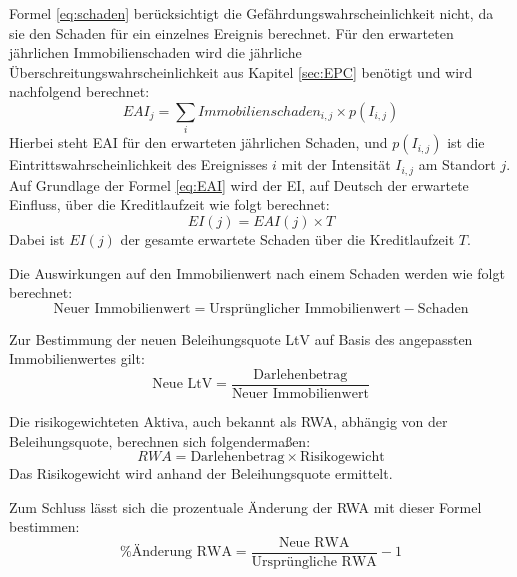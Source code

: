 Formel \ref{eq:schaden} berücksichtigt die Gefährdungswahrscheinlichkeit nicht, da sie den Schaden für ein einzelnes Ereignis berechnet. Für den erwarteten jährlichen Immobilienschaden wird die jährliche Überschreitungswahrscheinlichkeit aus Kapitel \ref{sec:EPC} benötigt und wird nachfolgend berechnet:
\begin{equation}
    EAI_j = \sum_i Immobilienschaden_{i,j} \times p(I_{i,j})
    \label{eq:EAI}
\end{equation}
Hierbei steht \ac{EAI} für den erwarteten jährlichen Schaden, und \( p(I_{i,j}) \) ist die Eintrittswahrscheinlichkeit des Ereignisses \( i \) mit der Intensität \( I_{i,j} \) am Standort \( j \).
Auf Grundlage der Formel \ref{eq:EAI} wird der \ac{EI}, auf Deutsch der erwartete Einfluss, über die Kreditlaufzeit wie folgt berechnet:
\begin{equation}
    EI(j) = EAI(j) \times T
\end{equation}
Dabei ist \( EI(j) \) der gesamte erwartete Schaden über die Kreditlaufzeit \( T \).

Die Auswirkungen auf den Immobilienwert nach einem Schaden werden wie folgt berechnet:
\begin{equation}
    \text{Neuer Immobilienwert} = \text{Ursprünglicher Immobilienwert} - \text{Schaden}
\end{equation}

Zur Bestimmung der neuen Beleihungsquote \ac{LtV} auf Basis des angepassten Immobilienwertes gilt:
\begin{equation}
    \text{Neue LtV} = \frac{\text{Darlehenbetrag}}{\text{Neuer Immobilienwert}}
\end{equation}

Die risikogewichteten Aktiva,  auch bekannt als \ac{RWA}, abhängig von der Beleihungsquote, berechnen sich folgendermaßen:
\begin{equation}
    RWA = \text{Darlehenbetrag} \times \text{Risikogewicht}
\end{equation}
Das Risikogewicht wird anhand der Beleihungsquote ermittelt.

Zum Schluss lässt sich die prozentuale Änderung der RWA mit dieser Formel bestimmen:
\begin{equation}
    \% \text{Änderung RWA} = \frac{\text{Neue RWA}}{\text{Ursprüngliche RWA}} - 1
\end{equation}
